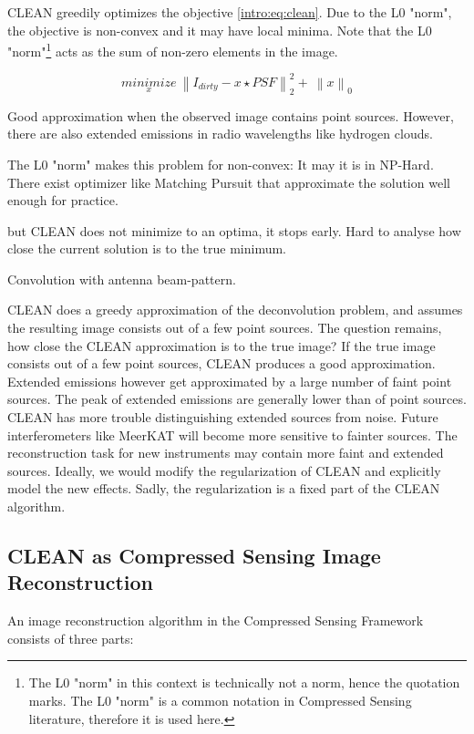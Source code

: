 CLEAN greedily optimizes the objective \eqref{intro:eq:clean}. Due to the L0 "norm", the objective is non-convex and it may have local minima. Note that the L0 "norm"\footnote{The L0 "norm" in this context is technically not a norm, hence the quotation marks. The L0 "norm" is a common notation in Compressed Sensing literature, therefore it is used here.} acts as the sum of non-zero elements in the image.

\begin{equation}\label{intro:eq:clean}
\underset{x}{minimize} \: \left \| I_{dirty} - x \star PSF \right \|_2^2 + \: \left \| x \right \|_0
\end{equation}

Good approximation when the observed image contains point sources. However, there are also extended emissions in radio wavelengths like hydrogen clouds.

The L0 "norm" makes this problem for non-convex: It may  it is in NP-Hard. There exist optimizer like Matching Pursuit that approximate the solution well enough for practice.

but CLEAN does not minimize to an optima, it stops early. Hard to analyse how close the current solution is to the true minimum.

Convolution with antenna beam-pattern.

CLEAN does a greedy approximation of the deconvolution problem, and assumes the resulting image consists out of a few point sources. The question remains, how close the CLEAN approximation is to the true image? If the true image consists out of a few point sources, CLEAN produces a good approximation. Extended emissions however get approximated by a large number of faint point sources. The peak of extended emissions are generally lower than of point sources. CLEAN has more trouble distinguishing extended sources from noise. Future interferometers like MeerKAT will become more sensitive to fainter sources. The reconstruction task for new instruments may contain more faint and extended sources. Ideally, we would modify the regularization of CLEAN and explicitly model the new effects. Sadly, the regularization is a fixed part of the CLEAN algorithm.


\subsection{CLEAN as Compressed Sensing Image Reconstruction}
An image reconstruction algorithm in the Compressed Sensing Framework consists of three parts:

